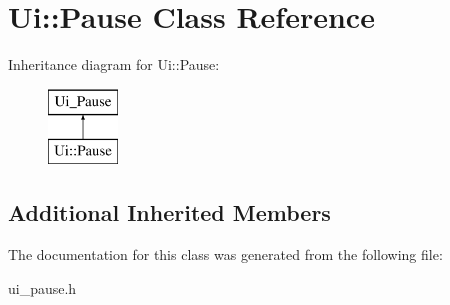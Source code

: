 \hypertarget{class_ui_1_1_pause}{\section{Ui\-:\-:Pause Class Reference}
\label{class_ui_1_1_pause}
}
Inheritance diagram for Ui\-:\-:Pause\-:\begin{figure}[H]
\begin{center}
\leavevmode
\includegraphics[height=2.000000cm]{class_ui_1_1_pause}
\end{center}
\end{figure}
\subsection*{Additional Inherited Members}


The documentation for this class was generated from the following file\-:\begin{DoxyCompactItemize}
\item 
ui\-\_\-pause.\-h\end{DoxyCompactItemize}
